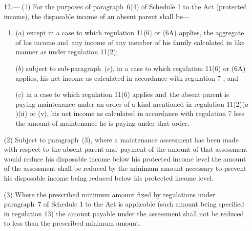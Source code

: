 \documentclass[12pt,a4paper]{article}
\begin{document}
12.—%
(1) For the purposes of paragraph~6(4) of Schedule 1 to the Act (protected income), the disposable income of an absent parent shall be—
\begin{enumerate}\item[]
($a$) except in a case to which regulation 11(6) 
or (6A)  %
applies, the aggregate of his income and~any income of any member of his family calculated in like manner as under regulation 11(2); 

($b$) 
subject to sub-paragraph~($c$),  %
in a case to which regulation 11(6) 
or (6A)  %
applies, his net income as calculated in accordance with regulation 7%
; and~ %

($c$) in a case to which regulation 11(6) applies and~the absent parent is paying maintenance under an order of a kind mentioned in regulation 11(2)($a$)(ii) or (v), his net income as calculated in accordance with regulation 7 less the amount of maintenance he is paying under that order.
\end{enumerate}

(2) Subject to paragraph~(3), where a maintenance assessment has been made with respect to the absent parent and~payment of the amount of that assessment would reduce his disposable income below his protected income level the amount of the assessment shall be reduced by the minimum amount necessary to prevent his disposable income being reduced below his protected income level.

(3) Where the prescribed minimum amount fixed by regulations under paragraph~7 of Schedule 1 to the Act is applicable (such amount being specified in regulation 13) the amount payable under the assessment shall not be reduced to less than the prescribed minimum amount.
\end{document}
